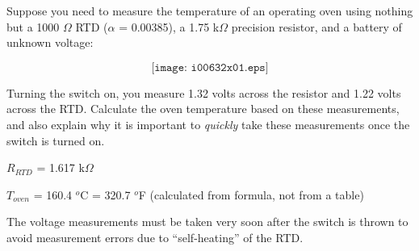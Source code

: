 

Suppose you need to measure the temperature of an operating oven using nothing but a 1000 $\Omega$ RTD ($\alpha$ = 0.00385), a 1.75 k$\Omega$ precision resistor, and a battery of unknown voltage:

$$\texttt{[image: i00632x01.eps]}$$

Turning the switch on, you measure 1.32 volts across the resistor and 1.22 volts across the RTD.  Calculate the oven temperature based on these measurements, and also explain why it is important to {\it quickly} take these measurements once the switch is turned on.







$R_{RTD}$ = 1.617 k$\Omega$

\vskip 10pt

$T_{oven}$ = 160.4 $^{o}$C = 320.7 $^{o}$F (calculated from formula, not from a table)

\vskip 10pt

The voltage measurements must be taken very soon after the switch is thrown to avoid measurement errors due to ``self-heating'' of the RTD.










